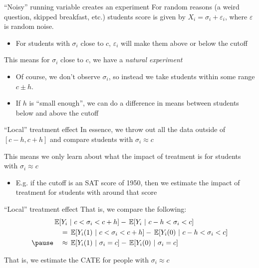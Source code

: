 \documentclass[aspectratio=169,t,11pt,table]{beamer}
\begin{document}
\begin{frame}{``Noisy'' running variable creates an experiment}{}
  For random reasons (a weird question, skipped breakfast, etc.) students score is given by $X_i = \sigma_i + \varepsilon_i$, where $\varepsilon$ is random noise.
  \begin{itemize}
    \item For students with $\sigma_i$ close to $c$, $\varepsilon_i$ will make them above or below the cutoff
  \end{itemize}

  \pause
  \bigskip
  This means for $\sigma_i$ close to $c$, we have a \emph{natural experiment}
  \begin{itemize}
    \item Of course, we don't observe $\sigma_i$, so instead we take students within some range $c \pm h$. 
    
    \item If $h$ is ``small enough'', we can do a difference in means between students below and above the cutoff
  \end{itemize}
\end{frame}


\begin{frame}{``Local'' treatment effect}{}
  In essence, we throw out all the data outside of $\left[ c-h, c+h \right]$ and compare students with $\sigma_i \approx c$
  
  \bigskip
  This means we only learn about what the impact of treatment is for students with $\sigma_i \approx c$
  \begin{itemize}
    \item E.g. if the cutoff is an SAT score of 1950, then we estimate the impact of treatment for students with around that score
  \end{itemize}
\end{frame}

\begin{frame}{``Local'' treatment effect}{}
  That is, we compare the following:
  \begin{align*}
    &\expec{Y_i}{c < \sigma_i < c+h} - \expec{Y_i}{c-h < \sigma_i < c} \\
    &\quad = \expec{Y_i(1)}{c < \sigma_i < c+h} - \expec{Y_i(0)}{c-h < \sigma_i < c} \\
    \pause
    &\quad \approx \expec{Y_i(1)}{\sigma_i = c} - \expec{Y_i(0)}{\sigma_i = c}
  \end{align*}

  That is, we estimate the CATE for people with $\sigma_i \approx c$
\end{frame}
\end{document}
